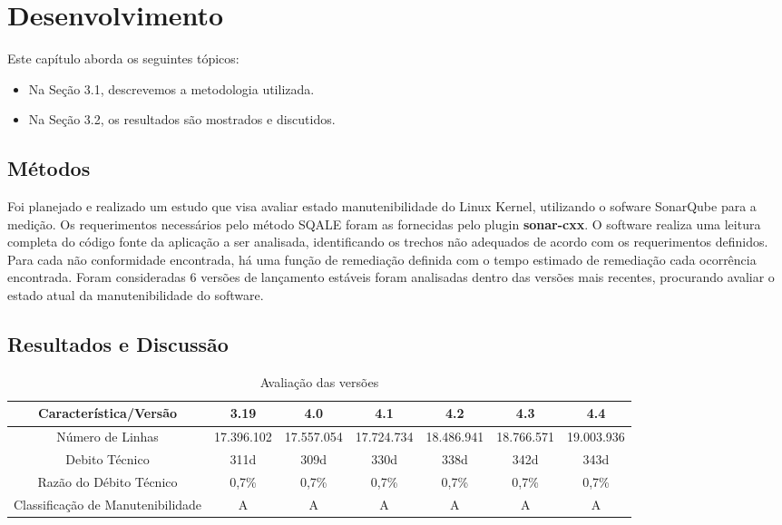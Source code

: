 \chapter{Desenvolvimento}
\label{chapter:desenvolvimento}

Este capítulo aborda os seguintes tópicos:
\begin{itemize}
\item Na Seção 3.1, descrevemos a metodologia utilizada.
\item Na Seção 3.2, os resultados são mostrados e discutidos.
\end{itemize}

\section{Métodos}

Foi planejado e realizado um estudo que visa avaliar estado manutenibilidade
do Linux Kernel, utilizando o sofware SonarQube para a medição. Os
requerimentos necessários pelo método SQALE foram as fornecidas pelo
plugin \textbf{sonar-cxx\cite{Sonarcxx2016}}. O software realiza
uma leitura completa do código fonte da aplicação a ser analisada,
identificando os trechos não adequados de acordo com os requerimentos
definidos. Para cada não conformidade encontrada, há uma função de
remediação definida com o tempo estimado de remediação cada ocorrência
encontrada. Foram consideradas 6 versões de lançamento estáveis foram
analisadas dentro das versões mais recentes, procurando avaliar o
estado atual da manutenibilidade do software. 

\section{Resultados e Discussão}

\begin{table}[h]
\begin{centering}
\begin{tabular}{|c|c|c|c|c|c|c|}
\hline 
{\scriptsize{}Característica/Versão} & {\scriptsize{}3.19} & {\scriptsize{}4.0} & {\scriptsize{}4.1} & {\scriptsize{}4.2} & {\scriptsize{}4.3} & {\scriptsize{}4.4}\tabularnewline
\hline 
\hline 
{\scriptsize{}Número de Linhas} & {\scriptsize{}17.396.102 } & {\scriptsize{}17.557.054 } & {\scriptsize{}17.724.734 } & {\scriptsize{}18.486.941 } & {\scriptsize{}18.766.571 } & {\scriptsize{}19.003.936 }\tabularnewline
\hline 
{\scriptsize{}Debito Técnico} & {\scriptsize{}311d} & {\scriptsize{}309d} & {\scriptsize{}330d} & {\scriptsize{}338d} & {\scriptsize{}342d} & {\scriptsize{}343d}\tabularnewline
\hline 
{\scriptsize{}Razão do Débito Técnico} & {\scriptsize{}0,7\%} & {\scriptsize{}0,7\%} & {\scriptsize{}0,7\%} & {\scriptsize{}0,7\%} & {\scriptsize{}0,7\%} & {\scriptsize{}0,7\%}\tabularnewline
\hline 
{\scriptsize{}Classificação de Manutenibilidade} & {\scriptsize{}A} & {\scriptsize{}A} & {\scriptsize{}A} & {\scriptsize{}A} & {\scriptsize{}A} & {\scriptsize{}A}\tabularnewline
\hline 
\end{tabular}
\par\end{centering}
\centering{}\caption{Avaliação das versões}
\label{Avalia=0000E7=0000E3o}
\end{table}


